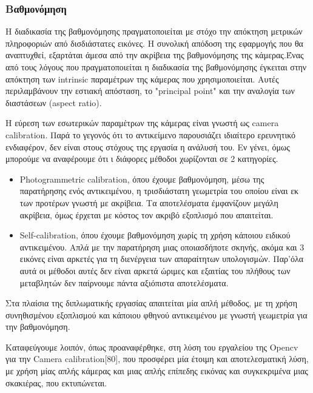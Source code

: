 \subsubsection{Βαθμονόμηση}



Η διαδικασία της βαθμονόμησης πραγματοποιείται με στόχο την απόκτηση μετρικών πληροφοριών από δισδιάστατες εικόνες. Η συνολική απόδοση της εφαρμογής που θα αναπτυχθεί, εξαρτάται άμεσα από την ακρίβεια της βαθμονόμησης της κάμερας.Ένας από τους λόγους που πραγματοποιείται η διαδικασία της βαθμονόμησης έγκειται στην απόκτηση των intrinsic παραμέτρων της κάμερας που χρησιμοποιείται. Αυτές περιλαμβάνουν την εστιακή απόσταση, το "principal point" και την αναλογία των διαστάσεων (aspect ratio). 


Η εύρεση των εσωτερικών παραμέτρων της κάμερας είναι γνωστή ως camera calibration. Παρά το γεγονός ότι το αντικείμενο παρουσιάζει ιδιαίτερο ερευνητικό ενδιαφέρον, δεν είναι στους στόχους της εργασία η ανάλυσή του. Εν γένει, όμως μπορούμε να αναφέρουμε ότι ι διάφορες μέθοδοι χωρίζονται σε 2 κατηγορίες.

\begin{itemize}
\item Photogrammetric calibration, όπου έχουμε βαθμονόμηση, μέσω της παρατήρησης ενός αντικειμένου, η τρισδιάστατη γεωμετρία του οποίου είναι εκ των προτέρων γνωστή με ακρίβεια. Τα αποτελέσματα έμφανίζουν μεγάλη ακρίβεια, όμως έρχεται με κόστος τον ακριβό εξοπλισμό που απαιτείται.
\item Self-calibration, όπου έχουμε βαθμονόμηση χωρίς τη χρήση κάποιου ειδικού αντικειμένου. Απλά με την παρατήρηση μιας οποιασδήποτε σκηνής, ακόμα και 3 εικόνες είναι αρκετές για τη διενέργεια των απαραίτητων υπολογισμών. Παρ'όλα
αυτά οι μέθοδοι αυτές δεν είναι αρκετά ώριμες και εξαιτίας του πλήθους των μεταβλητών δεν παίρνουμε πάντα αξιόπιστα αποτελέσματα.
\end{itemize}

Στα πλαίσια της διπλωματικής εργασίας απαιτείται μία απλή μέθοδος, με τη χρήση συνηθισμένου εξοπλισμού και κάποιου φθηνού αντικειμένου με γνωστή γεωμετρία για την βαθμονόμηση. 

Καταφεύγουμε λοιπόν, όπως προαναφέρθηκε, στη λύση του εργαλείου της Opencv για την Camera calibration[80], που προσφέρει μία έτοιμη και αποτελεσματική λύση, με χρήση μίας απλής κάμερας και μιας απλής επίπεδης εικόνας και συγκεκριμένα μιας σκακιέρας, που εκτυπώνεται. 

